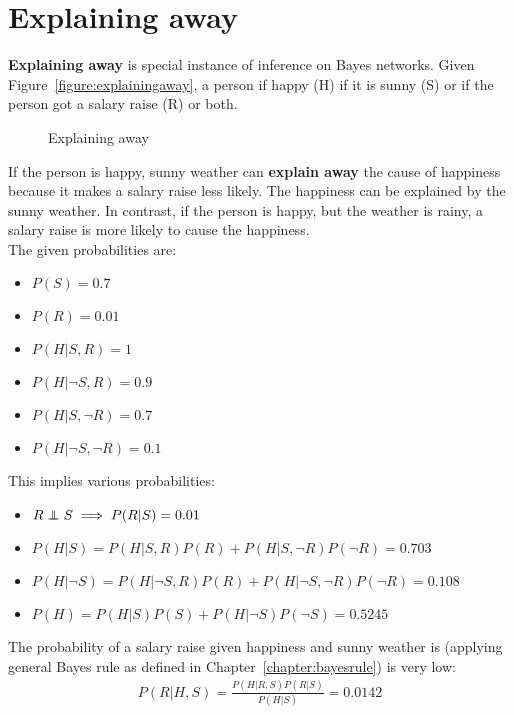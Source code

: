 \documentclass{report}
\newcommand\independent{\protect\mathpalette{\protect\independenT}{\perp}}
\def\independenT#1#2{\mathrel{\rlap{$#1#2$}\mkern2mu{#1#2}}}
\begin{document}
\section{Explaining away}
{\bf Explaining away} is special instance of inference on Bayes networks. Given Figure~\ref{figure:explainingaway}, a person if happy (H) if it is sunny (S) or if the person got a salary raise (R) or both.

\begin{figure}[h!]
\centering
{}
\caption{Explaining away}
\label{figure:explaining away}
\end{figure}

If the person is happy, sunny weather can {\bf explain away} the cause of happiness because it makes a salary raise less likely.
The happiness can be explained by the sunny weather.
In contrast, if the person is happy, but the weather is rainy, a salary raise is more likely to cause the happiness.
\\
The given probabilities are:
\begin{itemize}
\item $P(S) = 0.7$
\item $P(R) = 0.01$
\item $P(H\vert S, R) = 1$
\item $P(H\vert \neg S, R) = 0.9$
\item $P(H\vert S, \neg R) = 0.7$
\item $P(H\vert \neg S, \neg R) = 0.1$
\end{itemize}

This implies various probabilities:
\begin{itemize}
\item $R\independent S \implies P(R\vert S) = 0.01$
\item $P(H\vert S) = P(H\vert S, R)P(R) + P(H\vert S, \neg R)P(\neg R) = 0.703$
\item $P(H\vert \neg S) = P(H\vert \neg S, R)P(R) + P(H\vert \neg S, \neg R)P(\neg R) = 0.108$
\item $P(H) = P(H\vert S)P(S) + P(H\vert \neg S)P(\neg S) = 0.5245$
\end{itemize}

The probability of a salary raise given happiness and sunny weather is (applying general Bayes rule as defined in Chapter~\ref{chapter:bayesrule}) is very low:
\begin{align*}
P(R\vert H,S) = \frac{P(H\vert R, S)P(R\vert S)}{P(H\vert S)} = 0.0142
\end{align*}
\end{document}

